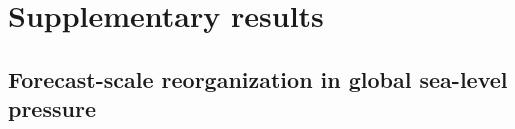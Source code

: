 \documentclass[fleqn,10pt]{wlscirep}
\newcommand{\rev}[1]{\textcolor{red}{#1}}
\begin{document}



\section{Supplementary results}
\subsection{Forecast-scale reorganization in global sea-level pressure}
\label{app:slp_results}
\end{document}
